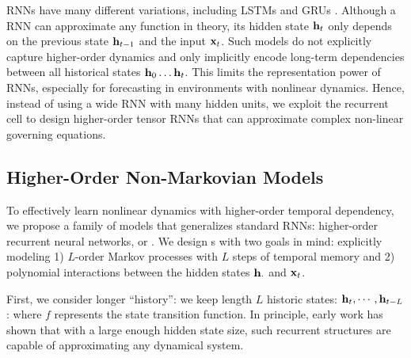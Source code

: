 RNNs have many different variations, including LSTMs \citep{hochreiter1997long} and GRUs \citep{chung2014empirical}. 
%
Although a RNN can approximate any function in theory, its hidden state ${\mathbf{h}}_t$  only depends on the previous state ${\mathbf{h}}_{t-1}$ and the input ${\mathbf{x}}_t$. Such models do not explicitly capture higher-order dynamics and only  implicitly encode long-term dependencies between all historical states ${\mathbf{h}}_{0} \ldots {\mathbf{h}}_{t}$. This limits the representation power of RNNs, especially for forecasting in environments with nonlinear dynamics. Hence, instead of using a wide RNN with many hidden units, we exploit the recurrent cell to design higher-order tensor RNNs that can approximate complex non-linear governing equations. 




\subsection{Higher-Order Non-Markovian Models}

To effectively learn nonlinear dynamics with higher-order temporal dependency, we propose a family of models that generalizes standard RNNs: higher-order recurrent neural networks, or  \trnn{}. 
%
We design \trnn{}s with two goals in mind: explicitly modeling 1) $L$-order Markov processes with $L$ steps of temporal memory and 2) polynomial interactions between the hidden states ${\mathbf{h}}_{\cdot}$ and ${\mathbf{x}}_t$.

First, we consider longer ``history'': we keep length $L$ historic states: ${\mathbf{h}}_{t},\cdots, {\mathbf{h}}_{t-L}$:
%
%
where $f$ represents the state transition function.  In principle, early work \citep{giles1989higher} has shown that with a large enough hidden state size, such recurrent structures are capable of approximating any dynamical system.

